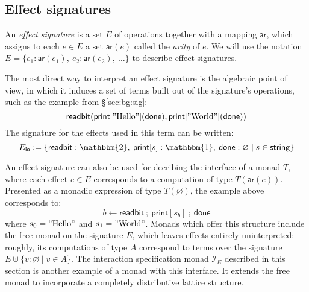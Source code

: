 \documentclass[format=sigplan,authordraft]{acmart}
\newcommand{\kw}[1]{\ensuremath{ \mathsf{#1} }}
\begin{document}

\subsection{Effect signatures} %

\begin{definition}
An \emph{effect signature}
is a set $E$ of operations
together with a mapping $\kw{ar}$,
which assigns to each $e \in E$ a set $\kw{ar}(e)$
called the \emph{arity} of $e$.
We will use the notation
$E = \{ e_1 : \kw{ar}(e_1), \: e_2 : \kw{ar}(e_2), \: \ldots \}$
to describe effect signatures.
\end{definition}

The most direct way to interpret an effect signature
is the algebraic point of view,
in which it induces a set of terms
built out of the signature's operations,
such as the example from \S\ref{sec:bg:sig}:
\[
    \kw{readbit}(
      \kw{print}["\text{Hello}"](\kw{done}),
      \kw{print}["\text{World}"](\kw{done}))
\]
The signature for the effects used in this term
can be written:
\[
  E_\kw{io} :=
  \{ \kw{readbit} : \mathbbm{2}, \:
     \kw{print}[s] : \mathbbm{1}, \:
     \kw{done} : \varnothing \mid
     s \in \kw{string} \}
\]

An effect signature can also be used
for decribing the interface of a monad $T$,
where each effect $e \in E$ corresponds to
a computation of type $T(\kw{ar}(e))$.
Presented as a monadic expression of type $T(\varnothing)$,
the example above corresponds to:
\[
  b \leftarrow \kw{readbit} \: ; \:
  \kw{print}[s_b] \: ; \:
  \kw{done}
\]
where $s_0 = "\text{Hello}"$ and $s_1 = "\text{World}"$.
Monads which offer this structure
include the free monad on the signature $E$,
which leaves effects entirely uninterpreted;
roughly, its computations of type $A$
correspond to terms over the signature
$E \uplus \{ v : \varnothing \mid v \in A \}$.
The interaction specification monad $\mathcal{I}_E$
described in this section is another example
of a monad with this interface.
It extends the free monad
to incorporate
a completely distributive lattice structure.
\end{document}
